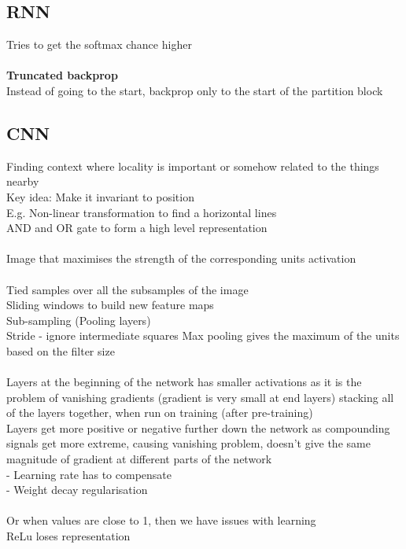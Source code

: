 \documentclass[11pt]{article}
\begin{document}
\subsection*{RNN}
Tries to get the softmax chance higher\\\\
\textbf{Truncated backprop}\\
Instead of going to the start, backprop only to the start of the partition block
\subsection*{CNN}
Finding context where locality is important or somehow related to the things nearby\\
Key idea: Make it invariant to position\\
E.g. Non-linear transformation to find a horizontal lines\\
AND and OR gate to form a high level representation\\
\\
Image that maximises the strength of the corresponding units activation\\
\\
Tied samples over all the subsamples of the image\\
Sliding windows to build new feature maps\\
Sub-sampling (Pooling layers)\\
Stride - ignore intermediate squares
Max pooling gives the maximum of the units based on the filter size\\
\\
Layers at the beginning of the network has smaller activations as it is the problem of vanishing gradients (gradient is very small at end layers) stacking all of the layers together, when run on training (after pre-training)
\\
Layers get more positive or negative further down the network as compounding signals get more extreme, causing vanishing problem, doesn't give the same magnitude of gradient at different parts of the network
\\
- Learning rate has to compensate\\
- Weight decay regularisation 
\\\\ 
Or when values are close to 1, then we have issues with learning
\\
ReLu loses representation \\
\\
\end{document}
